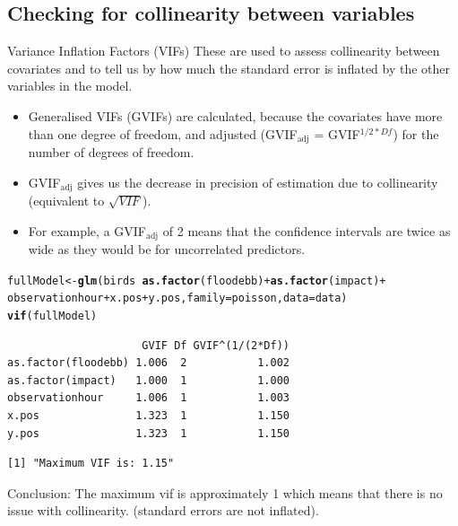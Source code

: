 \documentclass[11pt, a4paper]{article}
\makeatletter
\newcommand{\hlfunctioncall}[1]{\textcolor[rgb]{0.501960784313725,0,0.329411764705882}{\textbf{#1}}}%
\newenvironment{kframe}{%
 \def\at@end@of@kframe{}%
 \ifinner\ifhmode%
  \def\at@end@of@kframe{\end{minipage}}%
  \begin{minipage}{\columnwidth}%
 \fi\fi%
 \def\FrameCommand##1{\hskip\@totalleftmargin \hskip-\fboxsep
 \colorbox{shadecolor}{##1}\hskip-\fboxsep
     \hskip-\linewidth \hskip-\@totalleftmargin \hskip\columnwidth}%
 \MakeFramed {\advance\hsize-\width
   \@totalleftmargin\z@ \linewidth\hsize
   \@setminipage}}%
 {\par\unskip\endMakeFramed%
 \at@end@of@kframe}
\newenvironment{knitrout}{}{} %
\makeatother
\begin{document}
\subsection{Checking for collinearity between variables}

\begin{frame}[fragile]
\begin{block}{Variance Inflation Factors (VIFs)}
These are used to assess collinearity between covariates and to tell us by how much the standard error is inflated by the other variables in the model.
\end{block}

\begin{itemize}
\item Generalised VIFs (GVIFs) are calculated, because the covariates have more than one degree of freedom, and adjusted (GVIF$_{\textrm{adj}}$ = GVIF$^{1/2*Df}$) for the number of degrees of freedom.
\item GVIF$_{\textrm{adj}}$ gives us the decrease in precision of estimation due to collinearity (equivalent to $\sqrt{VIF}$). 
\item For example, a GVIF$_{\textrm{adj}}$ of 2 means that the confidence intervals are twice as wide as they would be for uncorrelated predictors.
\end{itemize}
\end{frame}

\begin{frame}[fragile]
\begin{knitrout}\footnotesize
{}\color{fgcolor}\begin{kframe}
\begin{alltt}
fullModel <- \hlfunctioncall{glm}(birds ~ \hlfunctioncall{as.factor}(floodebb) + \hlfunctioncall{as.factor}(impact) + 
    observationhour + x.pos + y.pos, family = poisson, data = data)
\hlfunctioncall{vif}(fullModel)
\end{alltt}
\begin{verbatim}
                     GVIF Df GVIF^(1/(2*Df))
as.factor(floodebb) 1.006  2           1.002
as.factor(impact)   1.000  1           1.000
observationhour     1.006  1           1.003
x.pos               1.323  1           1.150
y.pos               1.323  1           1.150
\end{verbatim}
\end{kframe}
\end{knitrout}


\begin{knitrout}\footnotesize
{}\color{fgcolor}\begin{kframe}
\begin{verbatim}
[1] "Maximum VIF is: 1.15"
\end{verbatim}
\end{kframe}
\end{knitrout}


\begin{block}{Conclusion:}
The maximum vif is approximately 1 which means that there is no issue with collinearity. (standard errors are not inflated).
\end{block}
\end{frame}
\end{document}
